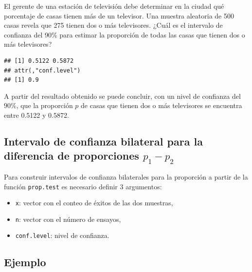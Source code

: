 \documentclass[10pt,]{krantz}
\makeatletter
\newenvironment{Shaded}{\begin{snugshade}}{\end{snugshade}}
\newcommand{\KeywordTok}[1]{\textcolor[rgb]{0.13,0.29,0.53}{\textbf{{#1}}}}
\newcommand{\DataTypeTok}[1]{\textcolor[rgb]{0.13,0.29,0.53}{{#1}}}
\newcommand{\DecValTok}[1]{\textcolor[rgb]{0.00,0.00,0.81}{{#1}}}
\newcommand{\FloatTok}[1]{\textcolor[rgb]{0.00,0.00,0.81}{{#1}}}
\newcommand{\NormalTok}[1]{{#1}}
\providecommand{\tightlist}{%
  \setlength{\itemsep}{0pt}\setlength{\parskip}{0pt}}
\newenvironment{kframe}{%
\medskip{}
\setlength{\fboxsep}{.8em}
 \def\at@end@of@kframe{}%
 \ifinner\ifhmode%
  \def\at@end@of@kframe{\end{minipage}}%
  \begin{minipage}{\columnwidth}%
 \fi\fi%
 \def\FrameCommand##1{\hskip\@totalleftmargin \hskip-\fboxsep
 \colorbox{shadecolor}{##1}\hskip-\fboxsep
     \hskip-\linewidth \hskip-\@totalleftmargin \hskip\columnwidth}%
 \MakeFramed {\advance\hsize-\width
   \@totalleftmargin\z@ \linewidth\hsize
   \@setminipage}}%
 {\par\unskip\endMakeFramed%
 \at@end@of@kframe}
\renewenvironment{Shaded}{\begin{kframe}}{\end{kframe}}
\makeatother
\begin{document}
El gerente de una estación de televisión debe determinar en la ciudad
qué porcentaje de casas tienen más de un televisor. Una muestra
aleatoria de 500 casas revela que 275 tienen dos o más televisores.
¿Cuál es el intervalo de confianza del 90\% para estimar la proporción
de todas las casas que tienen dos o más televisores?

\begin{Shaded}
\end{Shaded}

\begin{verbatim}
## [1] 0.5122 0.5872
## attr(,"conf.level")
## [1] 0.9
\end{verbatim}

A partir del resultado obtenido se puede concluir, con un nivel de
confianza del \(90\%\), que la proporción \(p\) de casas que tienen dos
o más televisores se encuentra entre 0.5122 y 0.5872.

\subsection{\texorpdfstring{Intervalo de confianza bilateral para la
diferencia de proporciones
\(p_1 - p_2\)}{Intervalo de confianza bilateral para la diferencia de proporciones p\_1 - p\_2}}\label{intervalo-de-confianza-bilateral-para-la-diferencia-de-proporciones-p_1---p_2}

Para construir intervalos de confianza bilaterales para la proporción a
partir de la función \texttt{prop.test} es necesario definir 3
argumentos:

\begin{itemize}
\tightlist
\item
  \texttt{x}: vector con el conteo de éxitos de las dos muestras,
\item
  \texttt{n}: vector con el número de ensayos,
\item
  \texttt{conf.level}: nivel de confianza.
\end{itemize}

\subsection*{Ejemplo}\label{ejemplo-60}
\end{document}
